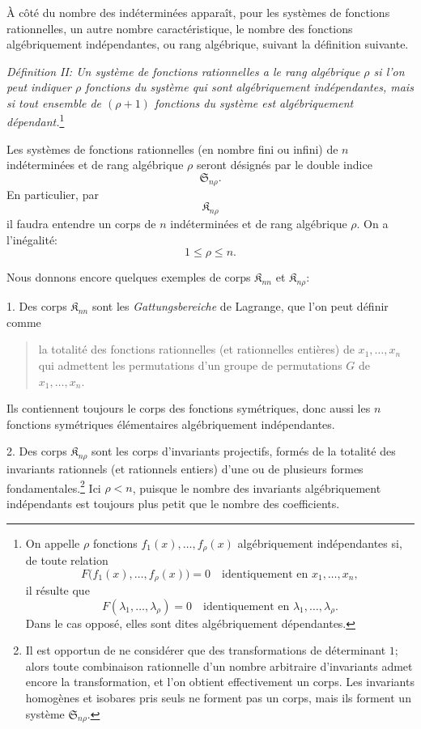\documentclass[11pt]{article}
\providecommand{\Kfield}{\mathfrak{K}}
\providecommand{\Ssys}{\mathfrak{S}}
\begin{document}
À côté du nombre des indéterminées apparaît, pour les systèmes de fonctions rationnelles, un autre nombre caractéristique, le nombre des fonctions algébriquement indépendantes, ou rang algébrique, suivant la définition suivante.

\emph{Définition II: Un système de fonctions rationnelles a le rang algébrique $\rho$ si l'on peut indiquer $\rho$ fonctions du système qui sont algébriquement indépendantes, mais si tout ensemble de $(\rho+1)$ fonctions du système est algébriquement dépendant.}\footnote{On appelle $\rho$ fonctions $f_1(x),\ldots,f_\rho(x)$ algébriquement indépendantes si, de toute relation
\[
F\bigl(f_1(x),\ldots,f_\rho(x)\bigr)=0\quad\text{identiquement en }x_1,\ldots,x_n,
\]
il résulte que
\[
F(\lambda_1,\ldots,\lambda_\rho)=0\quad\text{identiquement en }\lambda_1,\ldots,\lambda_\rho.
\]
Dans le cas opposé, elles sont dites algébriquement dépendantes.}

Les systèmes de fonctions rationnelles (en nombre fini ou infini) de $n$ indéterminées et de rang algébrique $\rho$ seront désignés par le double indice
\[
  \Ssys_{n\rho}.
\]
En particulier, par
\[
  \Kfield_{n\rho}
\]
il faudra entendre un corps de $n$ indéterminées et de rang algébrique $\rho$. On a l'inégalité:
\[
  1\leq \rho\leq n.
\]

Nous donnons encore quelques exemples de corps $\Kfield_{nn}$ et $\Kfield_{n\rho}$:

1. Des corps $\Kfield_{nn}$ sont les \emph{Gattungsbereiche} de Lagrange, que l'on peut définir comme
\begin{quote}
\og{}la totalité des fonctions rationnelles (et rationnelles entières) de $x_1,\ldots,x_n$ qui admettent les permutations d'un groupe de permutations $G$ de $x_1,\ldots,x_n$.\fg{}
\end{quote}
Ils contiennent toujours le corps des fonctions symétriques, donc aussi les $n$ fonctions symétriques élémentaires algébriquement indépendantes.

2. Des corps $\Kfield_{n\rho}$ sont les corps d'invariants projectifs, formés de la totalité des invariants rationnels (et rationnels entiers) d'une ou de plusieurs formes fondamentales.\footnote{Il est opportun de ne considérer que des transformations de déterminant $1$; alors toute combinaison rationnelle d'un nombre arbitraire d'invariants admet encore la transformation, et l'on obtient effectivement un corps. Les invariants homogènes et isobares pris seuls ne forment pas un corps, mais ils forment un système $\Ssys_{n\rho}$.} Ici $\rho<n$, puisque le nombre des invariants algébriquement indépendants est toujours plus petit que le nombre des coefficients.
\end{document}
